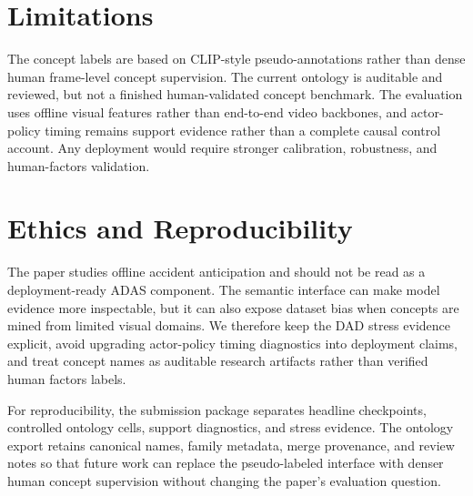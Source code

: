\documentclass[11pt]{article}
\begin{document}
\section*{Limitations}
The concept labels are based on CLIP-style pseudo-annotations rather than dense
human frame-level concept supervision. The current ontology is auditable and
reviewed, but not a finished human-validated concept benchmark. The evaluation
uses offline visual features rather than end-to-end video backbones, and
actor-policy timing remains support evidence rather than a complete causal
control account. Any deployment would require stronger calibration, robustness,
and human-factors validation.

\section*{Ethics and Reproducibility}
The paper studies offline accident anticipation and should not be read as a
deployment-ready ADAS component. The semantic interface can make model evidence
more inspectable, but it can also expose dataset bias when concepts are mined
from limited visual domains. We therefore keep the DAD stress evidence explicit,
avoid upgrading actor-policy timing diagnostics into deployment claims, and
treat concept names as auditable research artifacts rather than verified human
factors labels.

For reproducibility, the submission package separates headline checkpoints,
controlled ontology cells, support diagnostics, and stress evidence. The
ontology export retains canonical names, family metadata, merge provenance, and
review notes so that future work can replace the pseudo-labeled interface with
denser human concept supervision without changing the paper's evaluation
question.



\clearpage
\appendix

\end{document}
